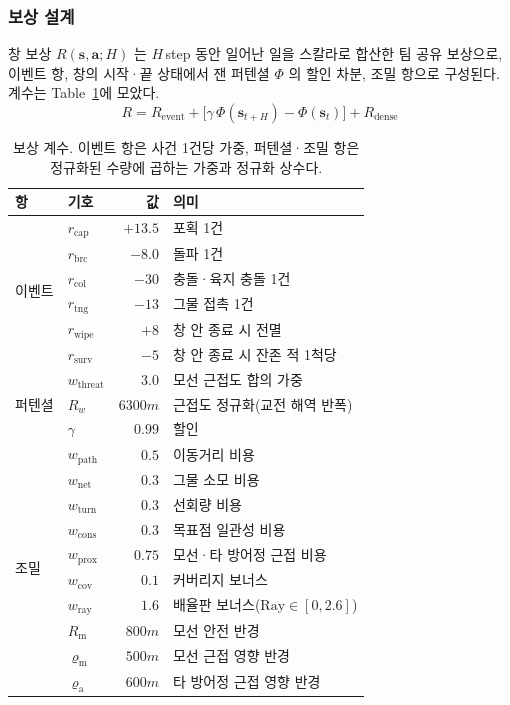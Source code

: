 \subsubsection{보상 설계}
\label{sec:reward}

창 보상 $R(\mathbf{s}, \mathbf{a}; H)$ 는 $H$\,step 동안 일어난 일을 스칼라로 합산한 팀 공유
보상으로, 이벤트 항, 창의 시작·끝 상태에서 잰 퍼텐셜 $\Phi$ 의 할인 차분, 조밀 항으로
구성된다. 계수는 Table~\ref{tab:reward_coef}에 모았다.
\begin{equation}
R = R_\mathrm{event} + \big[\gamma\,\Phi(\mathbf{s}_{t+H}) - \Phi(\mathbf{s}_t)\big] + R_\mathrm{dense}
\label{eq:reward}
\end{equation}

\begin{table}[tp]
\centering
\caption{보상 계수. 이벤트 항은 사건 1건당 가중, 퍼텐셜·조밀 항은 정규화된 수량에 곱하는
         가중과 정규화 상수다.}
\label{tab:reward_coef}
\footnotesize
\renewcommand{\arraystretch}{1.15}
\begin{tabular}{@{}llr@{\hspace{2mm}}l@{}}
\toprule
항 & 기호 & 값 & 의미 \\
\midrule
\multirow{6}{*}{이벤트}
 & $r_{\mathrm{cap}}$  & $+13.5$ & 포획 1건 \\
 & $r_{\mathrm{brc}}$  & $-8.0$  & 돌파 1건 \\
 & $r_{\mathrm{col}}$  & $-30$   & 충돌·육지 충돌 1건 \\
 & $r_{\mathrm{tng}}$  & $-13$   & 그물 접촉 1건 \\
 & $r_{\mathrm{wipe}}$ & $+8$    & 창 안 종료 시 전멸 \\
 & $r_{\mathrm{surv}}$ & $-5$    & 창 안 종료 시 잔존 적 1척당 \\
\midrule
\multirow{3}{*}{퍼텐셜}
 & $w_{\mathrm{threat}}$ & $3.0$  & 모선 근접도 합의 가중 \\
 & $R_w$                 & $6300\unit{m}$ & 근접도 정규화(교전 해역 반폭) \\
 & $\gamma$              & $0.99$ & 할인 \\
\midrule
\multirow{10}{*}{조밀}
 & $w_{\mathrm{path}}$ & $0.5$  & 이동거리 비용 \\
 & $w_{\mathrm{net}}$  & $0.3$  & 그물 소모 비용 \\
 & $w_{\mathrm{turn}}$ & $0.3$  & 선회량 비용 \\
 & $w_{\mathrm{cons}}$ & $0.3$  & 목표점 일관성 비용 \\
 & $w_{\mathrm{prox}}$ & $0.75$ & 모선·타 방어정 근접 비용 \\
 & $w_{\mathrm{cov}}$  & $0.1$  & 커버리지 보너스 \\
 & $w_{\mathrm{ray}}$  & $1.6$  & 배율판 보너스($\mathrm{Ray} \in [0, 2.6]$) \\
 & $R_{\mathrm{m}}$      & $800\unit{m}$ & 모선 안전 반경 \\
 & $\varrho_{\mathrm{m}}$ & $500\unit{m}$ & 모선 근접 영향 반경 \\
 & $\varrho_{\mathrm{a}}$ & $600\unit{m}$ & 타 방어정 근접 영향 반경 \\
\bottomrule
\end{tabular}
\end{table}

